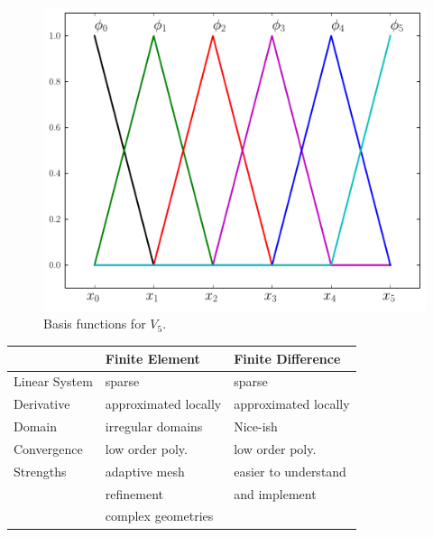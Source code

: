 \begin{figure}[ht]
\centering
\includegraphics[width=\textwidth]{basis_functions.pdf}
\caption{Basis functions for $V_5$.}
\label{FEM:basis_functions}
\end{figure}





\begin{center}
  \begin{tabular}{ l |l l }
     & Finite Element & Finite Difference  \\ \hline
    Linear System& sparse& sparse  \\ 
   Derivative & approximated locally & approximated locally \\
Domain & irregular domains & Nice-ish\\
Convergence & low order poly.& low order poly. \\
Strengths & adaptive mesh & easier to understand \\
&refinement & and implement \\
& complex geometries & \\
    \hline
  \end{tabular}
\end{center}


